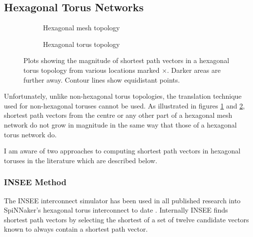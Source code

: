 		\subsection{Hexagonal Torus Networks}
			
			\begin{figure}
				\center
				
				\begin{subfigure}{\linewidth}
					\center
					\caption{Hexagonal mesh topology}
					\label{fig:distance-map-hex-mesh}
				\end{subfigure}
				
				\vspace{1em}
				
				\begin{subfigure}{\linewidth}
					\center
					\caption{Hexagonal torus topology}
					\label{fig:distance-map-hex-torus}
				\end{subfigure}
				
				\caption{Plots showing the magnitude of shortest path vectors in a
				hexagonal torus topology from various locations marked
				{\color{red}$\times$}.  Darker areas are further away. Contour lines show
				equidistant points.}
				
				\label{fig:distance-map-hex}
			\end{figure}
			
			Unfortunately, unlike non-hexagonal torus topologies, the translation
			technique used for non-hexagonal toruses cannot be used. As illustrated
			in figures \ref{fig:distance-map-hex-mesh} and
			\ref{fig:distance-map-hex-torus}, shortest path vectors from the centre
			or any other part of a hexagonal mesh network do not grow in magnitude in
			the same way that those of a hexagonal torus network do.
			
			I am aware of two approaches to computing shortest path vectors in
			hexagonal toruses in the literature which are described below.
			
			\subsubsection{INSEE Method}
			
				The INSEE interconnect simulator has been used in all published research
				into SpiNNaker's hexagonal torus interconnect to date
				\cite{navaridas09,ghasempour15}. Internally INSEE finds shortest path
				vectors by selecting the shortest of a set of twelve candidate vectors
				known to always contain a shortest path vector.
				
